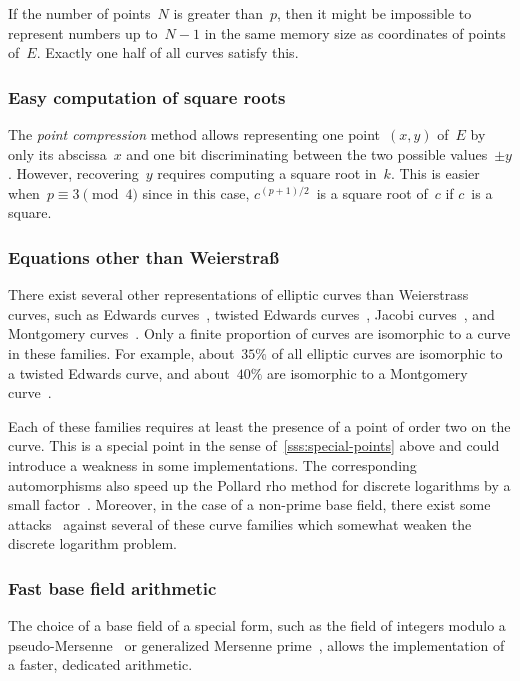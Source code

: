 \documentclass[twocolumn,letterpaper]{article}
\begin{document}
If the number of points~$N$ is greater than~$p$,
then it might be impossible to represent numbers up to~$N-1$
in the same memory size as coordinates of points of~$E$.
Exactly one half of all curves satisfy this.

\subsubsection{Easy computation of square roots}

The \emph{point compression} method allows representing
one point~$(x,y)$ of~$E$ by only its abscissa~$x$ and
one bit discriminating between the two possible values~$±y$.
However, recovering~$y$ requires computing a square root in~$k$.
This is easier when~$p ≡ 3 \pmod{4}$ since
in this case, $c^{(p+1)/2}$~is a square root of~$c$ if $c$~is a square.

\subsubsection{Equations other than Weierstraß}
\label{sss:other-eq}

There exist several other representations of elliptic curves
than Weierstrass curves, such as
Edwards curves~\cite{ams2007edwards},
twisted Edwards curves~\cite{africa2008bbjl},
Jacobi curves~\cite{aaaaec2003bj},
and Montgomery curves~\cite{mathcomp1987montgomery}.
Only a finite proportion of curves are isomorphic
to a curve in these families.
For example, about~$35\%$ of all elliptic curves
are isomorphic to a twisted Edwards curve,
and about~$40\%$ are isomorphic to a Montgomery curve~\cite{sac2011plut}.

Each of these families requires at least
the presence of a point of order two on the curve.
This is a special point in the sense of~\ref{sss:special-points} above
and could introduce a weakness in some implementations.
The corresponding automorphisms also speed up the Pollard rho
method for discrete logarithms by a small factor~\cite{moc2000glv}.
Moreover, in the case of a non-prime base field,
there exist some attacks~\cite{jc2014fghr}
against several of these curve families
which somewhat weaken the discrete logarithm problem.

\subsubsection{Fast base field arithmetic}
\label{sss:special-fast}

The choice of a base field of a special form,
such as the field of integers modulo
a pseudo-Mersenne~\cite{pkc2006bernstein}
or generalized Mersenne prime~\cite{nist2000fips186-2},
allows the implementation of a faster, dedicated arithmetic.
\end{document}
